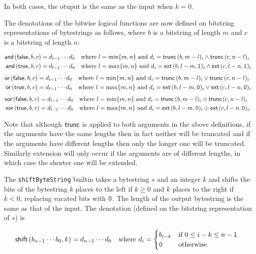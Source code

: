 \noindent In both cases, the otuput is the same as the input when $k=0$.
\smallskip

\noindent The denotations of the bitwise logical functions are now defined on bitstring
representations of bytestrings as follows, where $b$ is a bitstring of length $m$ and $c$
is a bitstring of length $n$:

\begin{align*}
\mathsf{and}\,(\mathsf{false}, b, c) &= d_{l-1} \cdots d_0
\quad \text{where $l=\min\{m,n\}$ and $d_i = \mathbf{\mathsf{trunc}}\,(b,m-l)_i \wedge \mathbf{\mathsf{trunc}}\,(c,n-l)_i$}\\
\mathsf{and}\,(\mathsf{true}, b, c) &= d_{l-1} \cdots d_0
\quad \text{where $l=\max\{m,n\}$ and $d_i = \mathbf{\textsf{ext}}\,(b,l-m,\mathtt{1})_i \wedge \mathbf{\textsf{ext}}\,(c,l-n,\mathtt{1})_i$}
\end{align*}
%
\begin{align*}
\mathsf{or}\,(\mathsf{false}, b, c) &= d_{l-1} \cdots d_0
  \quad \text{where $l=\min\{m,n\}$ and $d_i = \mathbf{\mathsf{trunc}}\,(b,m-l)_i \vee \mathbf{\mathsf{trunc}}\,(c,n-l)_i$}\\
\mathsf{or}\,(\mathsf{true}, b, c) &= d_{l-1} \cdots d_0
\quad \text{where $l=\max\{m,n\}$ and $d_i = \mathbf{\textsf{ext}}\,(b,l-m,\mathtt{0})_i \vee \mathbf{\textsf{ext}}\,(c,l-n,\mathtt{0})_i$}
\end{align*}
%
\begin{align*}
\mathsf{xor}\,(\mathsf{false}, b, c) &= d_{l-1} \cdots d_0
  \quad \text{where $l=\min\{m,n\}$ and $d_i = \mathbf{\mathsf{trunc}}\,(b,m-l)_i \oplus \mathbf{\mathsf{trunc}}\,(c,n-l)_i$}\\
\mathsf{xor}\,(\mathsf{true}, b, c) &= d_{l-1} \cdots d_0
\quad \text{where $l=\max\{m,n\}$ and $d_i = \mathbf{\textsf{ext}}\,(b,l-m,\mathtt{0})_i \oplus \mathbf{\textsf{ext}}\,(c,l-n,\mathtt{0})_i$}.
\end{align*}

\noindent
Note that although $\mathbf{\mathsf{trunc}}$ is applied to both arguments in the above
definitions, if the arguments have the same lengths then in fact neither will be
truncated and if the arguments have different lengths then only the longer one
will be truncated.  Similarly extension will only occur if the arguments are
of different lengths, in which case the shorter one will be extended.

\label{note:shift}
The \texttt{shiftByteString} builtin takes a bytestring $s$ and an integer $k$ and
shifts the bits of the bytestring $k$ places to the left if $k \geq 0$ and $k$
places to the right if $k < 0$, replacing vacated bits with $\mathtt{0}$.  The
length of the output bytestring is the same as that of the input.  The
denotation (defined on the bitstring representation of $s$) is

$$
\mathsf{shift}\,(b_{n-1} \cdots b_0, k) =
  d_{n-1} \cdots d_0 \quad \text{where }
  d_i = \begin{cases}
     b_{i-k} & \text{if $0 \leq i-k \leq n-1$ }\\
     \mathtt{0} & \text{otherwise.}\\
\end{cases}
$$

